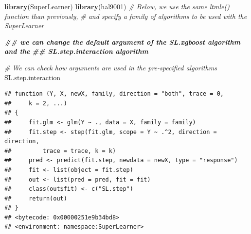\documentclass[
]{book}
\newenvironment{Shaded}{\begin{snugshade}}{\end{snugshade}}
\newcommand{\AttributeTok}[1]{\textcolor[rgb]{0.13,0.29,0.53}{#1}}
\newcommand{\CommentTok}[1]{\textcolor[rgb]{0.56,0.35,0.01}{\textit{#1}}}
\newcommand{\ControlFlowTok}[1]{\textcolor[rgb]{0.13,0.29,0.53}{\textbf{#1}}}
\newcommand{\DocumentationTok}[1]{\textcolor[rgb]{0.56,0.35,0.01}{\textbf{\textit{#1}}}}
\newcommand{\FunctionTok}[1]{\textcolor[rgb]{0.13,0.29,0.53}{\textbf{#1}}}
\newcommand{\NormalTok}[1]{#1}
\newcommand{\OtherTok}[1]{\textcolor[rgb]{0.56,0.35,0.01}{#1}}
\newcommand{\StringTok}[1]{\textcolor[rgb]{0.31,0.60,0.02}{#1}}
\begin{document}
\begin{Shaded}
\begin{Highlighting}[]
\FunctionTok{library}\NormalTok{(SuperLearner)}
\FunctionTok{library}\NormalTok{(hal9001)}
\CommentTok{\# Below, we use the same ltmle() function than previously, }
\CommentTok{\# and specify a family of algorithms to be used with the SuperLearner}

\DocumentationTok{\#\# we can change the default argument of the SL.xgboost algorithm and the }
\DocumentationTok{\#\# SL.step.interaction algorithm}

\CommentTok{\# We can check how arguments are used in the pre{-}specified algorithms}
\NormalTok{SL.step.interaction}
\end{Highlighting}
\end{Shaded}

\begin{verbatim}
## function (Y, X, newX, family, direction = "both", trace = 0, 
##     k = 2, ...) 
## {
##     fit.glm <- glm(Y ~ ., data = X, family = family)
##     fit.step <- step(fit.glm, scope = Y ~ .^2, direction = direction, 
##         trace = trace, k = k)
##     pred <- predict(fit.step, newdata = newX, type = "response")
##     fit <- list(object = fit.step)
##     out <- list(pred = pred, fit = fit)
##     class(out$fit) <- c("SL.step")
##     return(out)
## }
## <bytecode: 0x00000251e9b34bd8>
## <environment: namespace:SuperLearner>
\end{verbatim}

\begin{Shaded}
\end{Shaded}
\end{document}
